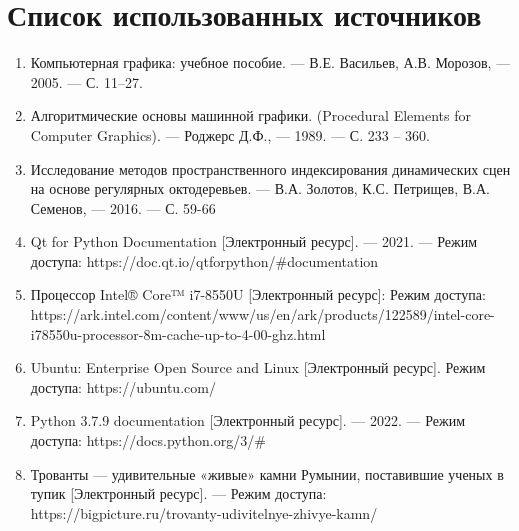 \chapter*{Список использованных источников}

\renewcommand{\theenumi}{\arabic{enumi}}
\renewcommand{\labelenumi}{\theenumi.}

\begin{enumerate}
\item Компьютерная графика: учебное пособие. --- В.Е. Васильев, А.В. Морозов, --- 2005. --- С. 11–27.
\item Алгоритмические основы машинной графики. (Procedural Elements for Computer Graphics). --- Роджерс Д.Ф., --- 1989. --- С. 233 – 360.
\item Исследование методов пространственного индексирования динамических сцен на основе регулярных октодеревьев. --- В.А. Золотов, К.С. Петрищев, В.А. Семенов, --- 2016. --- С. 59-66
\item Qt for Python Documentation [Электронный ресурс]. --- 2021. --- Режим доступа: https://doc.qt.io/qtforpython/\#documentation
\item Процессор Intel® Core™ i7-8550U [Электронный ресурс]: Режим доступа: https://ark.intel.com/content/www/us/en/ark/products/122589/intel-core-i78550u-processor-8m-cache-up-to-4-00-ghz.html
\item Ubuntu: Enterprise Open Source and Linux [Электронный ресурс]. Режим доступа: https://ubuntu.com/
\item Python 3.7.9 documentation [Электронный ресурс]. --- 2022. --- Ре­жим доступа: https://docs.python.org/3/\#
\item Трованты — удивительные «живые» камни Румынии, поставившие ученых в тупик
 [Электронный ресурс]. --- Режим доступа: \newline https://bigpicture.ru/trovanty-udivitelnye-zhivye-kamn/
\end{enumerate}